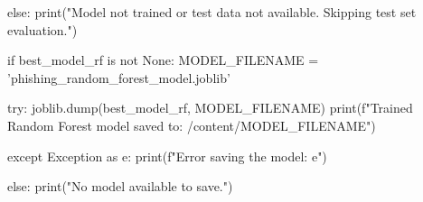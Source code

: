 \begin{ffcode}
else:
    print("Model not trained or test data not available. Skipping test set evaluation.")

if best_model_rf is not None:
    MODEL_FILENAME = 'phishing_random_forest_model.joblib'

    try:
        joblib.dump(best_model_rf, MODEL_FILENAME)
        print(f"Trained Random Forest model saved to: /content/{MODEL_FILENAME}")

    except Exception as e:
        print(f"Error saving the model: {e}")

else:
    print("No model available to save.")
\end{ffcode}